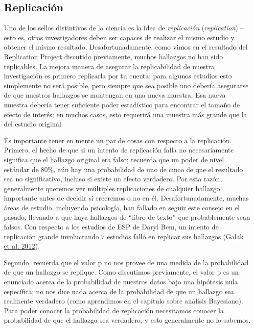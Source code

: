 \documentclass[
  12pt,
]{book}
\begin{document}
\hypertarget{replicaciuxf3n}{%
\subsection{Replicación}\label{replicaciuxf3n}}

Uno de los sellos distintivos de la ciencia es la idea de \emph{replicación} (\emph{replication}) -- esto es, otros investigadores deben ser capaces de realizar el mismo estudio y obtener el mismo resultado. Desafortunadamente, como vimos en el resultado del Replication Project discutido previamente, muchos hallazgos no han sido replicables. La mejora manera de asegurar la replicabilidad de nuestra investigación es primero replicarla por tu cuenta; para algunos estudios esto simplemente no será posible, pero siempre que sea posible uno debería asegurarse de que nuestros hallazgos se mantengan en una nueva muestra. Esa nueva muestra debería tener suficiente poder estadístico para encontrar el tamaño de efecto de interés; en muchos casos, esto requerirá una muestra más grande que la del estudio original.

Es importante tener en mente un par de cosas con respecto a la replicación. Primero, el hecho de que si un intento de replicación falla no necesariamente significa que el hallazgo original era falso; recuerda que un poder de nivel estándar de 80\%, aún hay una probabilidad de uno de cinco de que el resultado sea no significativo, incluso si existe un efecto verdadero. Por esta razón, generalmente queremos ver múltiples replicaciones de cualquier hallazgo importante antes de decidir si creeremos o no en él. Desafortunadamente, muchas áreas de estudio, incluyendo psicología, han fallado en seguir este consejo en el pasado, llevando a que haya hallazgos de ``libro de texto'' que probablemente sean falsos. Con respecto a los estudios de ESP de Daryl Bem, un intento de replicación grande involucrando 7 estudios falló en replicar sus hallazgos (\protect\hyperlink{ref-gala:lebo:nels:2012}{Galak et al. 2012}).

Segundo, recuerda que el valor p no nos provee de una medida de la probabilidad de que un hallazgo se replique. Como discutimos previamente, el valor p es un enunciado acerca de la probabilidad de nuestros datos bajo una hipótesis nula específica; no nos dice nada acerca de la probabilidad de que un hallazgo sea realmente verdadero (como aprendimos en el capítulo sobre análisis Bayesiano). Para poder conocer la probabilidad de replicación necesitamos conocer la probabilidad de que el hallazgo sea verdadero, y esto generalmente no lo sabemos.
\end{document}
